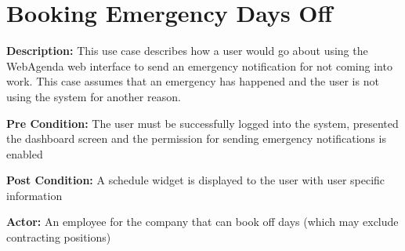 \documentclass[letterpaper,12pt]{report}
\begin{document}
\section{Booking Emergency Days Off}
\begin{description}
 \item \textbf{Description:} \newline This use case describes how a user would go about using the WebAgenda web interface to send an emergency notification for not coming into work. This case assumes that an emergency has happened and the user is not using the  system for another reason.
 \item \textbf{Pre Condition:} \newline The user must be successfully logged into the system, presented the dashboard screen and the permission for sending emergency notifications is enabled
 \item \textbf{Post Condition:} \newline A schedule widget is displayed to the user with user specific information
 \item \textbf{Actor:} \newline An employee for the company that can book off days (which may exclude contracting positions)
\end{description}
\end{document}
